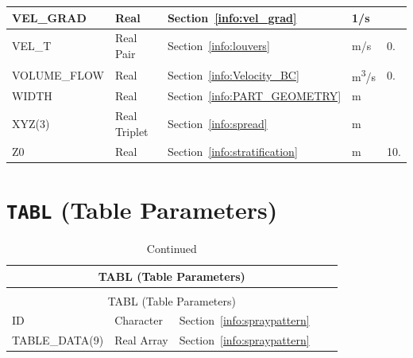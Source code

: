 \documentclass[11pt]{book}
\begin{document}
\begin{longtable}{@{\extracolsep{\fill}}|l|l|l|l|l|}
{\ct VEL\_GRAD}                       & Real            & Section~\ref{info:vel_grad}               & 1/s                 &                         \\ \hline
{\ct VEL\_T }                         & Real Pair       & Section~\ref{info:louvers}                & m/s                 & 0.                      \\ \hline
{\ct VOLUME\_FLOW}                    & Real            & Section~\ref{info:Velocity_BC}            & \si{m^3/s}          & 0.                      \\ \hline
{\ct WIDTH}                           & Real            & Section~\ref{info:PART_GEOMETRY}          & m                   &                         \\ \hline
{\ct XYZ(3)}                          & Real Triplet    & Section~\ref{info:spread}                 & m                   &                         \\ \hline
{\ct Z0 }                             & Real            & Section~\ref{info:stratification}         & m                   & 10.                     \\ \hline
\end{longtable}


\vspace{\baselineskip}


\section{\texorpdfstring{{\tt TABL}}{TABL} (Table Parameters)}


\begin{longtable}{@{\extracolsep{\fill}}|l|l|l|l|l|}
\caption[Table parameters ({\ct TABL} namelist group)]{For more information see Section~\ref{info:spraypattern}.}
\label{tbl:TABL} \\
\hline
\multicolumn{5}{|c|}{{\ct TABL} (Table Parameters)} \\
\hline \hline
\endfirsthead
\caption[]{Continued} \\
\hline
\multicolumn{5}{|c|}{{\ct TABL} (Table Parameters)} \\
\hline \hline
\endhead
{\ct ID}                & Character   & Section~\ref{info:spraypattern}      &             &     \\ \hline
{\ct TABLE\_DATA(9)}    & Real Array  & Section~\ref{info:spraypattern}      &             &     \\ \hline
\end{longtable}
\end{document}
